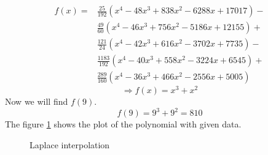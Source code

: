 \documentclass[]{book}
\begin{document}
\begin{equation*}
\begin{aligned}
f(x) ={} &\frac{25}{192}\left(x^{4}-48x^{3}+838x^{2}-6288x+17017\right)-\\
&\frac{49}{60}\left(x^{4}-46x^{3}+756x^{2}-5186x+12155\right)+\\
&\frac{121}{24}\left(x^{4}-42x^{3}+616x^{2}-3702x+7735\right)-\\
&\frac{1183}{192}\left(x^{4}-40x^{3}+558x^{2}-3224x+6545\right)+\\
&\frac{289}{160}\left(x^{4}-36x^{3}+466x^{2}-2556x+5005\right)
\end{aligned}
\end{equation*}
\begin{equation*}
\Rightarrow \boxed{f(x) ={} x^{3}+x^{2}}
\end{equation*}
Now we will find $f(9)$.
$$f(9) = 9^{3}+9^{2} = 810$$
The figure \ref{lap2} shows the plot of the polynomial with given data.
\begin{figure}
\begin{center}
\end{center}
\caption{Laplace interpolation}
\label{lap2}
\end{figure}
\end{document}
